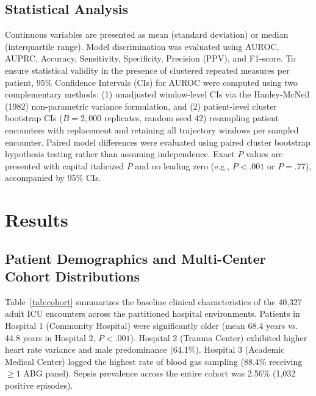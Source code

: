 \documentclass[11pt,a4paper]{article}
\begin{document}
\subsection{Statistical Analysis}
Continuous variables are presented as mean (standard deviation) or median (interquartile range). Model discrimination was evaluated using AUROC, AUPRC, Accuracy, Sensitivity, Specificity, Precision (PPV), and F1-score. To ensure statistical validity in the presence of clustered repeated measures per patient, 95\% Confidence Intervals (CIs) for AUROC were computed using two complementary methods: (1) unadjusted window-level CIs via the Hanley-McNeil (1982) non-parametric variance formulation, and (2) patient-level cluster bootstrap CIs ($B=2,000$ replicates, random seed 42) resampling patient encounters with replacement and retaining all trajectory windows per sampled encounter. Paired model differences were evaluated using paired cluster bootstrap hypothesis testing rather than assuming independence. Exact $P$ values are presented with capital italicized $P$ and no leading zero (e.g., $P<.001$ or $P=.77$), accompanied by 95\% CIs.

\section{Results}

\subsection{Patient Demographics and Multi-Center Cohort Distributions}
Table~\ref{tab:cohort} summarizes the baseline clinical characteristics of the 40,327 adult ICU encounters across the partitioned hospital environments. Patients in Hospital 1 (Community Hospital) were significantly older (mean 68.4 years vs. 44.8 years in Hospital 2, $P<.001$). Hospital 2 (Trauma Center) exhibited higher heart rate variance and male predominance (64.1\%). Hospital 3 (Academic Medical Center) logged the highest rate of blood gas sampling (88.4\% receiving $\ge 1$ ABG panel). Sepsis prevalence across the entire cohort was 2.56\% (1,032 positive episodes).
\end{document}
